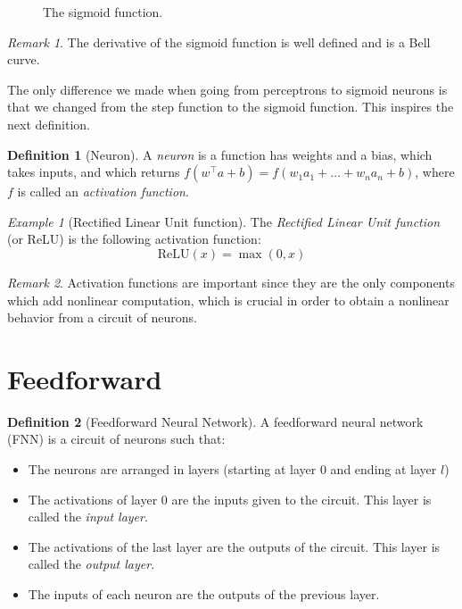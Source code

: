 \documentclass{article}
\theoremstyle{definition}
\newtheorem{definition}{Definition}[section]
\theoremstyle{remark}
\newtheorem*{remark}{Remark}
\theoremstyle{example}
\newtheorem{example}{Example}[section]
\newcommand{\ReLU}{\text{ReLU}}
\begin{document}
\begin{figure}[h!]
		\centering
		\scalebox{0.5}{}
        \caption{The sigmoid function.}
\end{figure}

\begin{remark}
    The derivative of the sigmoid function is well defined and is a Bell curve.
\end{remark}

The only difference we made when going from perceptrons to sigmoid neurons is that we changed from the step function to the sigmoid function. This inspires the next definition.

\begin{definition}[Neuron]
     A \textit{neuron} is a function has weights and a bias, which takes inputs, and which returns $f(w^\top a + b) = f(w_1 a_1 + \dots + w_n a_n + b)$, where $f$ is called an \textit{activation function}.
\end{definition}

\begin{example}[Rectified Linear Unit function]
    The \textit{Rectified Linear Unit function} (or ReLU) is the following activation function:
        $$\ReLU(x) = \max(0, x)$$
\end{example}

\begin{remark}
    Activation functions are important since they are the only components which add nonlinear computation, which is crucial in order to obtain a nonlinear behavior from a circuit of neurons.
\end{remark}

\section{Feedforward}

\begin{definition}[Feedforward Neural Network]
		A feedforward neural network (FNN) is a circuit of neurons such that:
		\begin{itemize}
				\item The neurons are arranged in layers (starting at layer 0 and ending at layer $l$)
				\item The activations of layer 0 are the inputs given to the circuit. This layer is called the \textit{input layer}.
				\item The activations of the last layer are the outputs of the circuit. This layer is called the \textit{output layer}.
				\item The inputs of each neuron are the outputs of the previous layer.
		\end{itemize}
\end{definition}
\end{document}
